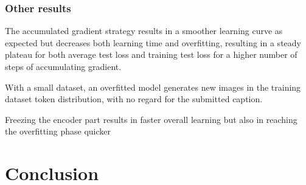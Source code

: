 \documentclass{article}
\begin{document}
\begin{multicols}{2}
\subsubsection{Other results}

The accumulated gradient strategy results in a smoother learning curve as expected but decreases both learning time and overfitting, resulting in a steady plateau for both average test loss and training test loss for a higher number of steps of accumulating gradient.

With a small dataset, an overfitted model generates new images in the training dataset token distribution, with no regard for the submitted caption.

Freezing the encoder part results in faster overall learning but also in reaching the overfitting phase quicker

\end{multicols}


\pagebreak

\section{Conclusion}
\end{document}
